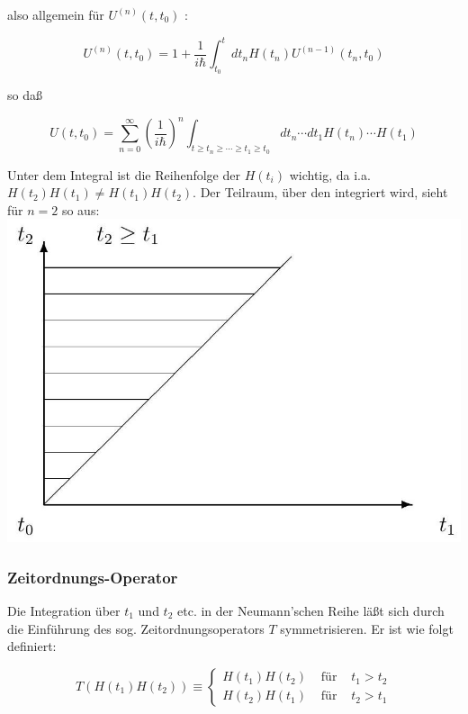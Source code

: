 \documentclass[10pt, letterpaper]{article}
\begin{document}
also allgemein für $U^{(n)}\left(t, t_{0}\right)$ :

$$
U^{(n)}\left(t, t_{0}\right)=1+\frac{1}{i \hbar} \int_{t_{0}}^{t} d t_{n} H\left(t_{n}\right) U^{(n-1)}\left(t_{n}, t_{0}\right)
$$

so daß

$$
U\left(t, t_{0}\right)=\sum_{n=0}^{\infty}\left(\frac{1}{i \hbar}\right)^{n} \int_{t \geq t_{n} \geq \cdots \geq t_{1} \geq t_{0}} d t_{n} \cdots d t_{1} H\left(t_{n}\right) \cdots H\left(t_{1}\right)
$$

Unter dem Integral ist die Reihenfolge der $H\left(t_{i}\right)$ wichtig, da i.a. $H\left(t_{2}\right) H\left(t_{1}\right) \neq H\left(t_{1}\right) H\left(t_{2}\right)$. Der Teilraum, über den integriert wird, sieht für $n=2$ so aus:\\
\includegraphics[max width=\textwidth, center]{2025_06_07_f7019c98c95e0473d81eg-03}

\subsubsection*{Zeitordnungs-Operator}
Die Integration über $t_{1}$ und $t_{2}$ etc. in der Neumann'schen Reihe läßt sich durch die Einführung des sog. Zeitordnungsoperators $T$ symmetrisieren. Er ist wie folgt definiert:

$$
T\left(H\left(t_{1}\right) H\left(t_{2}\right)\right) \equiv\left\{\begin{array}{lll}
H\left(t_{1}\right) H\left(t_{2}\right) & \text { für } & t_{1}>t_{2} \\
H\left(t_{2}\right) H\left(t_{1}\right) & \text { für } & t_{2}>t_{1}
\end{array}\right.
$$
\end{document}
